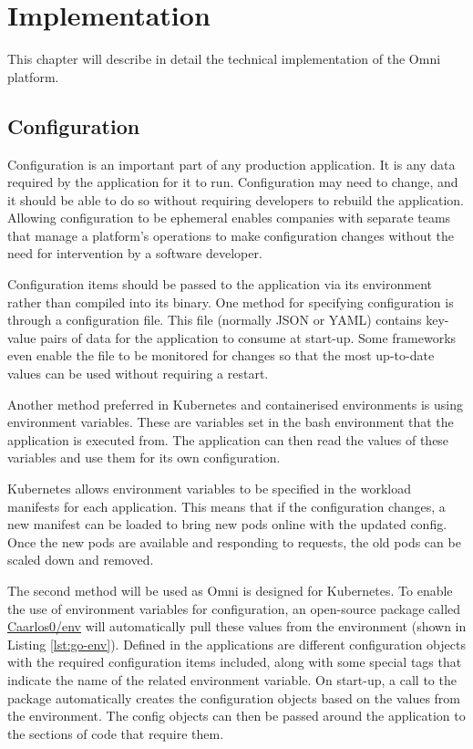 \chapter{Implementation}
\label{cha:implementation}

This chapter will describe in detail the technical implementation of the Omni platform.

\section{Configuration}
Configuration is an important part of any production application. It is any data required by the application for it to run.
Configuration may need to change, and it should be able to do so without requiring developers to rebuild the application.
Allowing configuration to be ephemeral enables companies with separate teams that manage a platform's operations to make configuration changes without the need for intervention by a software developer.

Configuration items should be passed to the application via its environment rather than compiled into its binary.
One method for specifying configuration is through a configuration file. This file (normally JSON or YAML) contains key-value pairs of data for the application to consume at start-up.
Some frameworks even enable the file to be monitored for changes so that the most up-to-date values can be used without requiring a restart. 

Another method preferred in Kubernetes and containerised environments is using environment variables.
These are variables set in the bash environment that the application is executed from. The application can then read the values of these variables and use them for its own configuration.

Kubernetes allows environment variables to be specified in the workload manifests for each application.
This means that if the configuration changes, a new manifest can be loaded to bring new pods online with the updated config. Once the new pods are available and responding to requests, the old pods can be scaled down and removed.



The second method will be used as Omni is designed for Kubernetes. To enable the use of environment variables for configuration, an open-source package called \underline{\href{https://github.com/caarlos0/env}{Caarlos0/env}} \nocite{env} will automatically pull these values from the environment (shown in Listing \ref{lst:go-env}).
Defined in the applications are different configuration objects with the required configuration items included, along with some special tags that indicate the name of the related environment variable.
On start-up, a call to the package automatically creates the configuration objects based on the values from the environment. The config objects can then be passed around the application to the sections of code that require them.

